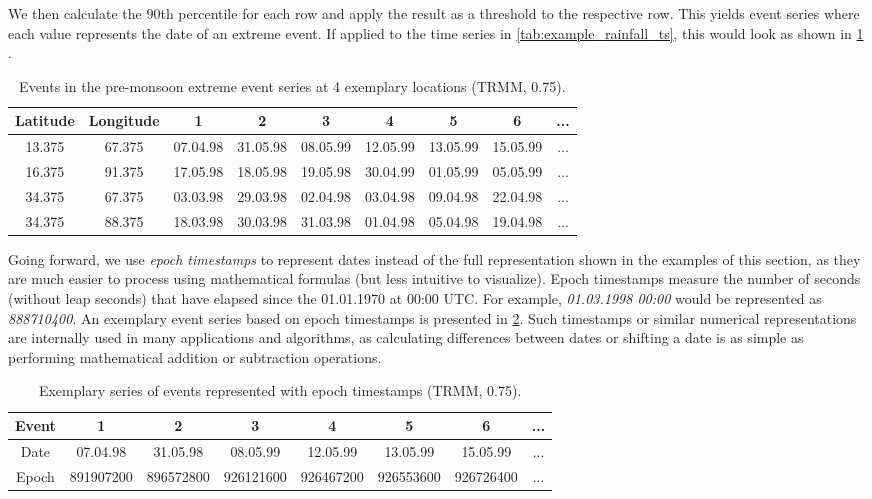 We then calculate the 90th percentile for each row and apply the result as a threshold to the respective row. This yields event series where each value represents the date of an extreme event. If applied to the time series in \cref{tab:example_rainfall_ts}, this would look as shown in \cref{tab:example_rainfall_events} .

\begin{table}[h]
  \centering
  \begin{tabular}{ |c|c|ccccccc| }
    \hline
    Latitude & Longitude & 1 & 2 & 3 & 4 & 5 & 6 & ... \\
    \hline
    13.375 & 67.375 & 07.04.98 & 31.05.98 & 08.05.99 & 12.05.99 & 13.05.99 & 15.05.99 & ... \\
    16.375 & 91.375 & 17.05.98 & 18.05.98 & 19.05.98 & 30.04.99 & 01.05.99 & 05.05.99 & ... \\
    34.375 & 67.375 & 03.03.98 & 29.03.98 & 02.04.98 & 03.04.98 & 09.04.98 & 22.04.98 & ... \\
    34.375 & 88.375 & 18.03.98 & 30.03.98 & 31.03.98 & 01.04.98 & 05.04.98 & 19.04.98 & ... \\
    \hline
  \end{tabular}
  \caption{Events in the pre-monsoon extreme event series at 4 exemplary locations (TRMM, 0.75\degree).}
  \label{tab:example_rainfall_events}
\end{table}

Going forward, we use \textit{epoch timestamps} to represent dates instead of the full representation shown in the examples of this section, as they are much easier to process using mathematical formulas (but less intuitive to visualize). Epoch timestamps measure the number of seconds (without leap seconds) that have elapsed since the 01.01.1970 at 00:00 UTC. For example, \textit{01.03.1998 00:00} would be represented as \textit{888710400}. An exemplary event series based on epoch timestamps is presented in \cref{tab:example_rainfall_events_unix}. Such timestamps or similar numerical representations are internally used in many applications and algorithms, as calculating differences between dates or shifting a date is as simple as performing mathematical addition or subtraction operations.

\begin{table}[h]
  \centering
  \begin{tabular}{ |c|ccccccc| }
    \hline
    Event & 1 & 2 & 3 & 4 & 5 & 6 & ... \\
    \hline
    Date & 07.04.98 & 31.05.98 & 08.05.99 & 12.05.99 & 13.05.99 & 15.05.99 & ... \\
    Epoch & 891907200 & 896572800 & 926121600 & 926467200 & 926553600 & 926726400 & ... \\
    \hline
  \end{tabular}
  \caption{Exemplary series of events represented with epoch timestamps (TRMM, 0.75\degree).}
  \label{tab:example_rainfall_events_unix}
\end{table}

